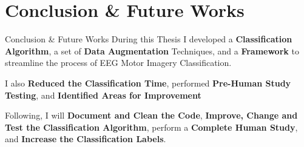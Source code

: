 \section{Conclusion \& Future Works}
\begin{frame}{Conclusion \& Future Works}
    During this Thesis I developed a \textbf{Classification Algorithm}, a set of \textbf{Data Augmentation} Techniques, and a \textbf{Framework} to streamline the process of EEG Motor Imagery Classification.

    \vspace*{0.5cm}
    I also \textbf{Reduced the Classification Time}, performed \textbf{Pre-Human Study Testing}, and \textbf{Identified Areas for Improvement}
    
    \vspace*{0.5cm}
    Following, I will \textbf{Document and Clean the Code}, \textbf{Improve, Change and Test the Classification Algorithm}, perform a \textbf{Complete Human Study}, and \textbf{Increase the Classification Labels}.
\end{frame}